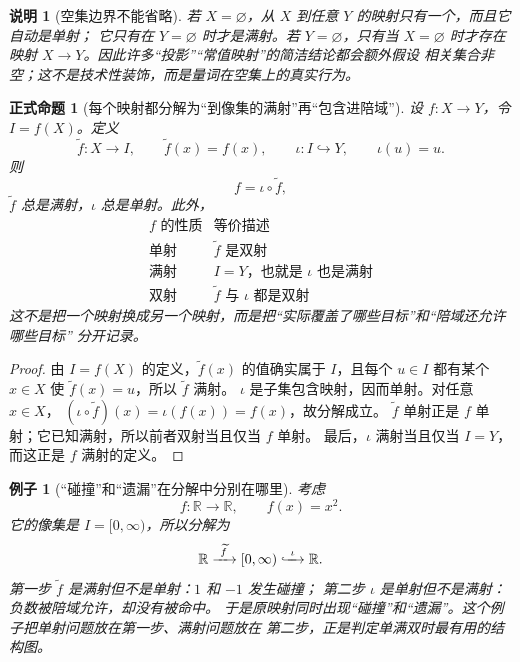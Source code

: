 \documentclass[UTF8,fontset=none,a4paper,11pt]{ctexart}
\theoremstyle{foundation-definition}
\theoremstyle{foundation-theorem}
\theoremstyle{foundation-proposition}
\newtheorem{proposition}[definition]{正式命题}
\theoremstyle{foundation-example}
\newtheorem{example}[definition]{例子}
\theoremstyle{foundation-remark}
\newtheorem{remark}[definition]{说明}
\theoremstyle{foundation-theorem}
\begin{document}
\begin{remark}[空集边界不能省略]
若 \(X=\varnothing\)，从 \(X\) 到任意 \(Y\) 的映射只有一个，而且它自动是单射；
它只有在 \(Y=\varnothing\) 时才是满射。若 \(Y=\varnothing\)，只有当 \(X=\varnothing\)
时才存在映射 \(X\to Y\)。因此许多“投影”“常值映射”的简洁结论都会额外假设
相关集合非空；这不是技术性装饰，而是量词在空集上的真实行为。
\end{remark}

\begin{proposition}[每个映射都分解为“到像集的满射”再“包含进陪域”]
\label{prop:map-image-factorization}
设 \(f:X\to Y\)，令 \(I=f(X)\)。定义
\[
\widetilde f:X\longrightarrow I,\qquad \widetilde f(x)=f(x),
\qquad
\iota:I\hookrightarrow Y,\qquad \iota(u)=u.
\]
则
\[
f=\iota\circ\widetilde f,
\]
\(\widetilde f\) 总是满射，\(\iota\) 总是单射。此外，
\[
\begin{array}{c|c}
\text{\(f\) 的性质}&\text{等价描述}\\
\hline
\text{单射}&\widetilde f\text{ 是双射}\\
\text{满射}&I=Y\text{，也就是 }\iota\text{ 也是满射}\\
\text{双射}&\widetilde f\text{ 与 }\iota\text{ 都是双射}
\end{array}
\]
这不是把一个映射换成另一个映射，而是把“实际覆盖了哪些目标”和“陪域还允许哪些目标”
分开记录。
\end{proposition}

\begin{proof}
由 \(I=f(X)\) 的定义，\(\widetilde f(x)\) 的值确实属于 \(I\)，且每个 \(u\in I\)
都有某个 \(x\in X\) 使 \(\widetilde f(x)=u\)，所以 \(\widetilde f\) 满射。
\(\iota\) 是子集包含映射，因而单射。对任意 \(x\in X\)，
\((\iota\circ\widetilde f)(x)=\iota(f(x))=f(x)\)，故分解成立。
\(\widetilde f\) 单射正是 \(f\) 单射；它已知满射，所以前者双射当且仅当 \(f\) 单射。
最后，\(\iota\) 满射当且仅当 \(I=Y\)，而这正是 \(f\) 满射的定义。
\end{proof}

\begin{example}[“碰撞”和“遗漏”在分解中分别在哪里]
考虑
\[
f:\mathbb R\longrightarrow\mathbb R,\qquad f(x)=x^2.
\]
它的像集是 \(I=[0,\infty)\)，所以分解为
\[
\mathbb R\xrightarrow{\ \widetilde f\ }[0,\infty)
\lhook\joinrel\xrightarrow{\ \iota\ }\mathbb R.
\]
第一步 \(\widetilde f\) 是满射但不是单射：\(1\) 和 \(-1\) 发生碰撞；
第二步 \(\iota\) 是单射但不是满射：负数被陪域允许，却没有被命中。
于是原映射同时出现“碰撞”和“遗漏”。这个例子把单射问题放在第一步、满射问题放在
第二步，正是判定单满双时最有用的结构图。
\end{example}
\end{document}

